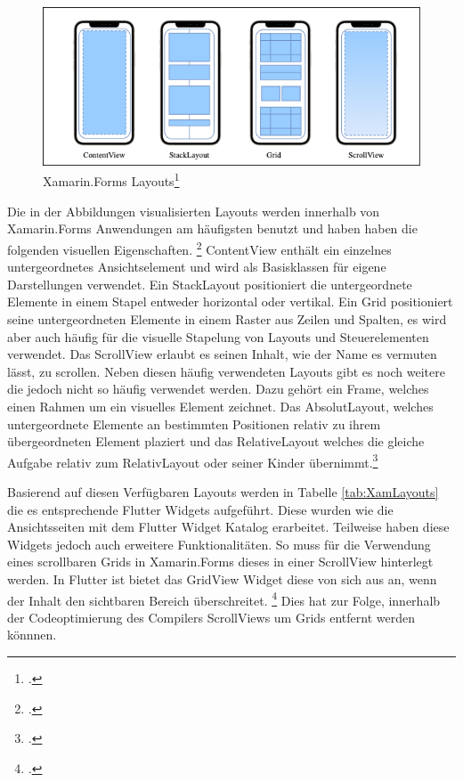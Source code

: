 \begin{figure}[!ht]
 \includegraphics[width=\textwidth,height=\textheight,keepaspectratio]{Images/CrossPlattformFrameworks/XamarinFormsLayouts.png}
 \caption[Xamarin.Forms Layouts]{Xamarin.Forms Layouts\footcite{MicrosoftXamViews2020}}
 \label{fig:Xamarin.Forms Layouts}
\end{figure}

Die in der Abbildungen visualisierten Layouts werden innerhalb von Xamarin.Forms Anwendungen am häufigsten benutzt und haben haben die folgenden visuellen Eigenschaften.  \footcitetext[Abbildung in Anlehnung an ][Abgerufen am \today]{MicrosoftXamLayouts2018} \glq ContentView\grq{}  enthält ein einzelnes untergeordnetes Ansichtselement und wird als Basisklassen für eigene Darstellungen verwendet.  Ein \glq StackLayout\grq{}  positioniert die untergeordnete Elemente in einem Stapel entweder horizontal oder vertikal.  Ein \glq Grid\grq{}  positioniert seine untergeordneten Elemente in einem Raster aus Zeilen und Spalten,  es wird aber auch häufig für die visuelle Stapelung von Layouts und Steuerelementen verwendet.  Das \glq ScrollView\grq{} erlaubt es seinen Inhalt, wie der Name es vermuten lässt,  zu scrollen. Neben diesen häufig verwendeten Layouts gibt es noch weitere die jedoch nicht so häufig verwendet werden.  Dazu gehört ein Frame, welches einen Rahmen um ein visuelles Element zeichnet.  Das AbsolutLayout, welches untergeordnete Elemente an bestimmten Positionen relativ zu ihrem übergeordneten Element plaziert und das RelativeLayout welches die gleiche Aufgabe relativ zum RelativLayout oder seiner Kinder übernimmt.\footcite[Vgl.][Abgerufen am \today]{MicrosoftXamLayouts2018}

Basierend auf diesen Verfügbaren Layouts werden in Tabelle \ref{tab:XamLayouts}  die es entsprechende Flutter Widgets aufgeführt.  Diese wurden wie die Ansichtsseiten mit dem Flutter Widget Katalog erarbeitet.  Teilweise haben diese Widgets jedoch auch erweitere Funktionalitäten.  So muss für die Verwendung eines scrollbaren \glq Grids in Xamarin.Forms dieses in einer \glq ScrollView\grq{}  hinterlegt werden. In Flutter ist bietet das \glq GridView\grq{}  Widget diese von sich aus an,  wenn der Inhalt den sichtbaren Bereich überschreitet. \footcite[Vgl.][Abgerufen am \today]{GoogleFlutterGridView2020} Dies hat zur Folge,  innerhalb der Codeoptimierung des Compilers \glq ScrollViews\grq{}  um \glq Grids\grq{}  entfernt werden könnnen. 

